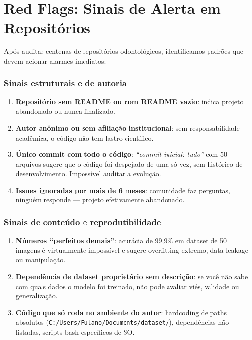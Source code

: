 \section{Red Flags: Sinais de Alerta em Repositórios}

Após auditar centenas de repositórios odontológicos, identificamos
padrões que devem acionar alarmes imediatos:

\subsubsection{Sinais estruturais e de autoria}

\begin{enumerate}
  \item \textbf{Repositório sem README ou com README vazio}: indica
    projeto abandonado ou nunca finalizado.

  \item \textbf{Autor anônimo ou sem afiliação institucional}: sem
    responsabilidade acadêmica, o código não tem lastro científico.

  \item \textbf{Único commit com todo o código}: \textit{``commit inicial:
    tudo''} com 50 arquivos sugere que o código foi despejado de uma só
    vez, sem histórico de desenvolvimento. Impossível auditar a evolução.

  \item \textbf{Issues ignoradas por mais de 6 meses}: comunidade faz
    perguntas, ninguém responde — projeto efetivamente abandonado.
\end{enumerate}

\subsubsection{Sinais de conteúdo e reprodutibilidade}

\begin{enumerate}
  \item \textbf{Números ``perfeitos demais''}: acurácia de 99,9\% em
    dataset de 50 imagens é virtualmente impossível e sugere overfitting
    extremo, data leakage ou manipulação.

  \item \textbf{Dependência de dataset proprietário sem descrição}:
    se você não sabe com quais dados o modelo foi treinado, não pode
    avaliar viés, validade ou generalização.

  \item \textbf{Código que só roda no ambiente do autor}: hardcoding de
    paths absolutos (\texttt{C:/Users/Fulano/Documents/dataset/}),
    dependências não listadas, scripts bash específicos de SO.
\end{enumerate}

